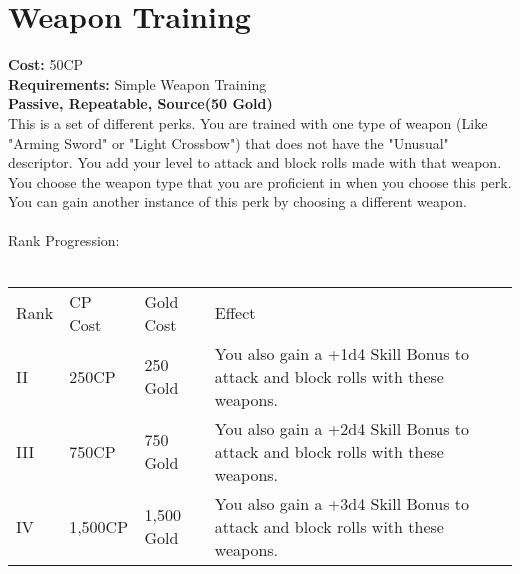\section{Weapon Training}\label{perk:weaponTraining}
\textbf{Cost:} 50CP\\
\textbf{Requirements:} Simple Weapon Training\\
\textbf{Passive, Repeatable, Source(50 Gold)}\\
This is a set of different perks.
You are trained with one type of weapon (Like "Arming Sword" or "Light Crossbow") that does not have the "Unusual" descriptor.
You add your level to attack and block rolls made with that weapon.\\
You choose the weapon type that you are proficient in when you choose this perk.
You can gain another instance of this perk by choosing a different weapon.\\
\\
Rank Progression:\\
\\
\begin{longtable}{l | l | l | p{9cm}}
	Rank & CP Cost & Gold Cost & Effect\\
	II & 250CP & 250 Gold & You also gain a +1d4 Skill Bonus to attack and block rolls with these weapons.\\
	III & 750CP & 750 Gold & You also gain a +2d4 Skill Bonus to attack and block rolls with these weapons.\\
	IV & 1,500CP & 1,500 Gold & You also gain a +3d4 Skill Bonus to attack and block rolls with these weapons.\\
\end{longtable}